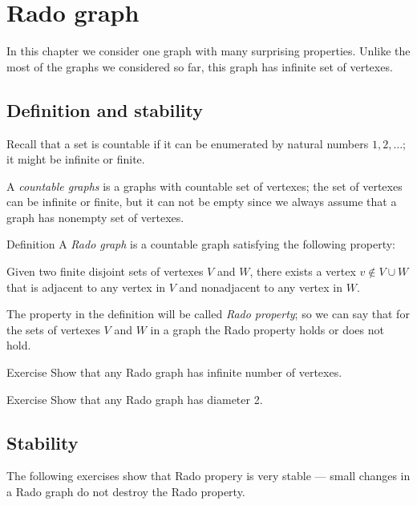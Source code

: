 \chapter{Rado graph}

In this chapter we consider one graph with many surprising properties.
Unlike the most of the graphs we considered so far, this graph has infinite set of vertexes.

\section*{Definition and stability}

Recall that a set is countable if it can be enumerated by natural numbers $1,2,\dots$;
it might be infinite or finite.

A \emph{countable graphs} is a graphs with countable set of vertexes;
the set of vertexes can be infinite or finite, but it can not be empty since we always assume that a graph has nonempty set of vertexes.


\begin{thm}{Definition}
A \emph{Rado graph} is a countable graph satisfying the following property:

Given two finite disjoint sets of vertexes $V$ and $W$, there exists a
vertex $v\notin V\cup W$ that is adjacent to any vertex in $V$ and nonadjacent to any vertex in $W$.
\end{thm}

The property in the definition will be called \emph{Rado property}; so we can say that for the sets of vertexes $V$ and $W$ in a graph the Rado property holds or does not hold.

\begin{thm}{Exercise}
Show that any Rado graph has infinite number of vertexes. 
\end{thm}

\begin{thm}{Exercise}
Show that any Rado graph has diameter 2. 
\end{thm}

\section*{Stability}

The following exercises show that Rado propery is very stable --- small changes in a Rado graph do not destroy the Rado property.


